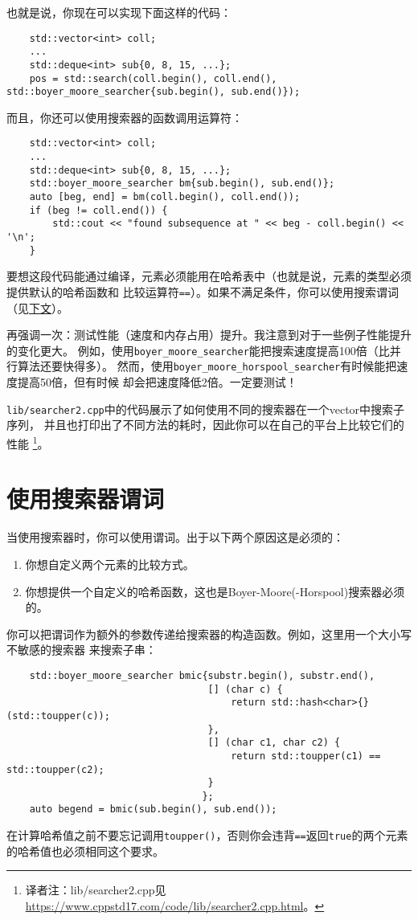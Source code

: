 也就是说，你现在可以实现下面这样的代码：
\begin{lstlisting}
    std::vector<int> coll;
    ...
    std::deque<int> sub{0, 8, 15, ...};
    pos = std::search(coll.begin(), coll.end(), std::boyer_moore_searcher{sub.begin(), sub.end()});
\end{lstlisting}
而且，你还可以使用搜索器的函数调用运算符：
\begin{lstlisting}
    std::vector<int> coll;
    ...
    std::deque<int> sub{0, 8, 15, ...};
    std::boyer_moore_searcher bm{sub.begin(), sub.end()};
    auto [beg, end] = bm(coll.begin(), coll.end());
    if (beg != coll.end()) {
        std::cout << "found subsequence at " << beg - coll.begin() << '\n';
    }
\end{lstlisting}
要想这段代码能通过编译，元素必须能用在哈希表中（也就是说，元素的类型必须提供默认的哈希函数和
比较运算符\texttt{==}）。如果不满足条件，你可以使用搜索谓词（见\hyperref[ch24.3]{下文}）。

再强调一次：测试性能（速度和内存占用）提升。我注意到对于一些例子性能提升的变化更大。
例如，使用\texttt{boyer\_moore\_searcher}能把搜索速度提高100倍（比并行算法还要快得多）。
然而，使用\texttt{boyer\_moore\_horspool\_searcher}有时候能把速度提高50倍，但有时候
却会把速度降低2倍。一定要测试！

\texttt{lib/searcher2.cpp}中的代码展示了如何使用不同的搜索器在一个vector中搜索子序列，
并且也打印出了不同方法的耗时，因此你可以在自己的平台上比较它们的性能
\footnote{译者注：lib/searcher2.cpp见\url{https://www.cppstd17.com/code/lib/searcher2.cpp.html}。}。

\section{使用搜索器谓词}\label{ch24.3}
当使用搜索器时，你可以使用谓词。出于以下两个原因这是必须的：
\begin{enumerate}
    \item 你想自定义两个元素的比较方式。
    \item 你想提供一个自定义的哈希函数，这也是Boyer-Moore(-Horspool)搜索器必须的。
\end{enumerate}
你可以把谓词作为额外的参数传递给搜索器的构造函数。例如，这里用一个大小写不敏感的搜索器
来搜索子串：
\begin{lstlisting}
    std::boyer_moore_searcher bmic{substr.begin(), substr.end(),
                                   [] (char c) {
                                       return std::hash<char>{}(std::toupper(c));
                                   },
                                   [] (char c1, char c2) {
                                       return std::toupper(c1) == std::toupper(c2);
                                   }
                                  };
    auto begend = bmic(sub.begin(), sub.end());
\end{lstlisting}
在计算哈希值之前不要忘记调用\texttt{toupper()}，否则你会违背\texttt{==}返回\texttt{true}的两个元素
的哈希值也必须相同这个要求。


